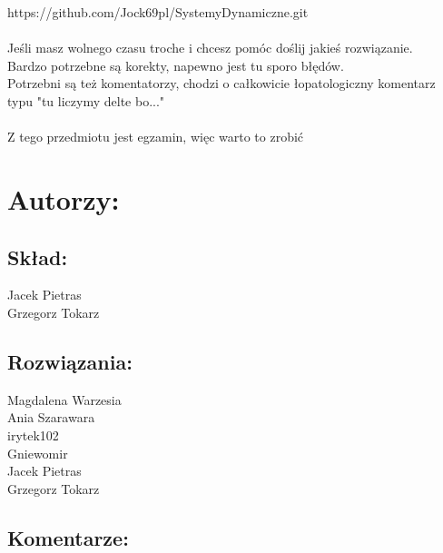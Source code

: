 \documentclass[a4paper,10pt]{article}
\begin{document}
\noindent https://github.com/Jock69pl/SystemyDynamiczne.git\\
\\
Jeśli masz wolnego czasu troche i chcesz pomóc doślij jakieś rozwiązanie.\\
Bardzo potrzebne są korekty, napewno jest tu sporo błędów.\\
Potrzebni są też komentatorzy, chodzi o całkowicie łopatologiczny komentarz typu "tu liczymy delte bo..."\\
\\
Z tego przedmiotu jest egzamin, więc warto to zrobić






 

\pagebreak
\section*{Autorzy:}

\subsection*{Skład:} 
Jacek Pietras\\
Grzegorz Tokarz

\subsection*{Rozwiązania:} 
Magdalena Warzesia\\
Ania Szarawara\\
irytek102\\
Gniewomir\\
Jacek Pietras\\
Grzegorz Tokarz

\subsection*{Komentarze:} 
\end{document}
